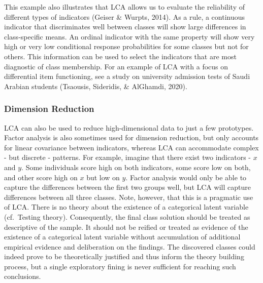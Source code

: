 \documentclass[
  ,man,floatsintext]{apa6}
\begin{document}
This example also illustrates that LCA allows us to evaluate the reliability of different types of indicators (Geiser \& Wurpts, 2014).
As a rule, a continuous indicator that discriminates well between classes will show large differences in class-specific means. An ordinal indicator with the same property will show very high or very low conditional response probabilities for some classes but not for others.
This information can be used to select the indicators that are most diagnostic of class membership.
For an example of LCA with a focus on differential item functioning,
see a study on university admission tests of Saudi Arabian students (Tsaousis, Sideridis, \& AlGhamdi, 2020).

\hypertarget{dimension-reduction}{%
\subsubsection{Dimension Reduction}\label{dimension-reduction}}

LCA can also be used to reduce high-dimensional data
to just a few prototypes.
Factor analysis is also sometimes used for dimension reduction,
but only accounts for linear covariance between indicators,
whereas LCA can accommodate complex - but discrete - patterns.
For example, imagine that there exist two indicators - \(x\) and \(y\). Some individuals score high on both indicators, some score low on both, and other score high on \(x\) but low on \(y\).
Factor analysis would only be able to capture the differences between the first two groups well, but LCA will capture differences between all three classes. Note, however, that this is a pragmatic use of LCA. There is no theory about the existence of a categorical latent variable (cf.~Testing theory).
Consequently, the final class solution should be treated as descriptive of the sample.
It should not be reified or treated as evidence of the existence of a categorical latent variable without accumulation of additional empirical evidence and deliberation on the findings. The discovered classes could indeed prove to be theoretically justified and thus inform the theory building process, but a single exploratory fining is never sufficient for reaching such conclusions.
\end{document}
